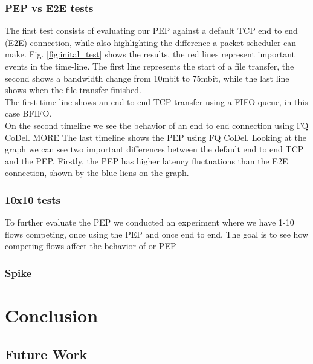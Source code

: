 \documentclass[a4paper,english, 11pt]{report}
\begin{document}
\subsection{PEP vs E2E tests}
The first test consists of evaluating our PEP against a default TCP end to end (E2E) connection, while also highlighting the difference a packet scheduler can make. Fig. \ref{fig:inital_test} shows the results, the red lines represent important events in the time-line.
The first line represents the start of a file transfer, the second shows a bandwidth change from 10mbit to 75mbit, while the last line shows when the file transfer finished.\\ 

The first time-line shows an end to end TCP transfer using a FIFO queue, in this case BFIFO.\\ 
On the second timeline we see the behavior of an end to end connection using FQ CoDel. {MORE}
The last timeline shows the PEP using FQ CoDel. Looking at the graph we can see two important differences between the default end to end TCP and the PEP. Firstly, the PEP has higher latency fluctuations than the E2E connection, shown by the blue liens on the graph. 


\subsection{10x10 tests}
To further evaluate the PEP we conducted an experiment where we have 1-10 flows competing, once using the PEP and once end to end. The goal is to see how competing flows affect the behavior of or PEP

\subsection{Spike}

\chapter{Conclusion}

\section{Future Work}

{}

\end{document}
